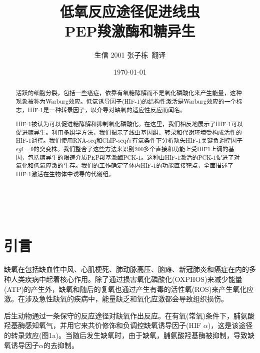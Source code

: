 \documentclass{ctexart}
\title{低氧反应途径促进线虫\\PEP羧激酶和糖异生}
\author{生信 2001 张子栋\ 翻译}
\date{\today}
\begin{document}
    \thispagestyle{empty}
    \maketitle

    \clearpage
    \thispagestyle{empty}
    ~

    \clearpage

    \thispagestyle{empty}

    \begin{abstract}

        活跃的细胞分裂，包括一些癌症，依靠有氧糖酵解而不是氧化磷酸化来产生能量，这种现象被称为Warburg效应。低氧诱导因子(HIF-1)的结构性激活是Warburg效应的一个标志，HIF-1是一种转录因子，以介导对缺氧的适应性反应而闻名。

        HIF-1被认为可以促进糖酵解和抑制氧化磷酸化。在这里，我们相反地展示了HIF-1可以促进糖异生。利用多组学方法，我们揭示了线虫基因组、转录和代谢环境受构成活性的HIF-1调控。我们使用RNA-seq和ChIP-seq在有氧条件下分析缺失HIF-1关键负调控因子$egl-9$的突变株。我们整合了这些方法来识别200多个直接和功能上受HIF1上调的基因，包括糖异生的限速介质PEP羧基激酶PCK-1。这种由HIF-1激活的PCK-1促进了对氧化和低氧应激的生存。我们的工作确定了体内HIF-1的功能直接靶点，全面描述了HIF-1激活在生物体中诱导的代谢组。

    \end{abstract}

    \clearpage

    \tableofcontents
    
    \setcounter{page}{0}

    \thispagestyle{empty}

    \clearpage

    \section{引言}

        缺氧在包括缺血性中风、心肌梗死、肺动脉高压、脑瘫、新冠肺炎和癌症在内的多种人类疾病中起着核心作用。除了通过损害氧化磷酸化(OXPHOS)来减少能量(ATP)的产生外，缺氧和随后的复氧也通过产生有毒的活性氧(ROS)来产生氧化应激。在涉及急性缺氧的疾病中，能量缺乏和氧化应激都会导致组织损伤。

        后生动物通过一条保守的反应途径对缺氧作出反应。在有氧(常氧)条件下，脯氨酸羟基酶感知氧气，并用它来共价修饰和负调控缺氧诱导因子(HIF $\alpha$)，这是该途径的转录效应(图1a)。当随后发生缺氧时，由于缺氧，脯氨酸羟基酶被抑制，导致缺氧诱导因子$\alpha$的去抑制。
\end{document}
